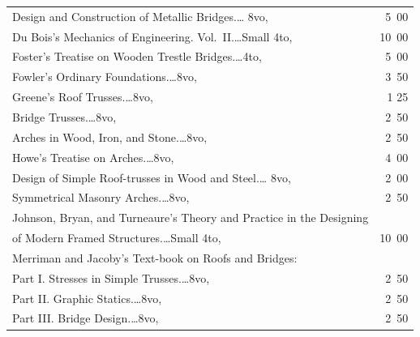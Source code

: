 \documentclass[a4paper,12pt]{book}[2004/02/16]
\theoremstyle{ilemma}
\theoremstyle{itheorem}
\theoremstyle{iother}
\theoremstyle{icorollary}
\theoremstyle{numcorollary}
\theoremstyle{idefinition}
\begin{document}
\begin{longtable}{@{}l@{ }r@{}}
\nopagebreak

\indent Design and Construction of Metallic Bridges.\dotfill\ldots
8vo, &5\ 00\\

Du Bois's Mechanics of Engineering. Vol.~II.\dotfill\ldots Small 4to,
&10\ 00\\

Foster's Treatise on Wooden Trestle Bridges.\dotfill\ldots 4to, &5\ 00\\

Fowler's Ordinary Foundations.\dotfill\ldots 8vo, &3\ 50\\

Greene's Roof Trusses.\dotfill\ldots 8vo, &1 25\\

\nopagebreak

\indent Bridge Trusses.\dotfill\ldots 8vo, &2\ 50\\

\nopagebreak

\indent Arches in Wood, Iron, and Stone.\dotfill\ldots 8vo, &2\ 50\\

Howe's Treatise on Arches.\dotfill\ldots 8vo, &4\ 00\\

\nopagebreak

\indent Design of Simple Roof-trusses in Wood and Steel.\dotfill\ldots
8vo, &2\ 00\\

\nopagebreak

\indent Symmetrical Masonry Arches.\dotfill\ldots 8vo, &2\ 50\\

Johnson, Bryan, and Turneaure's Theory and Practice in the Designing\\

\nopagebreak

\indent\indent of Modern Framed Structures.\dotfill\ldots Small 4to,
&10\ 00\\

Merriman and Jacoby's Text-book on Roofs and Bridges:\\

\indent Part I\@. Stresses in Simple Trusses.\dotfill\ldots 8vo, &2\ 50\\

\indent Part II\@. Graphic Statics.\dotfill\ldots 8vo, &2\ 50\\

\indent Part III\@. Bridge Design.\dotfill\ldots 8vo, &2\ 50\\


\end{longtable}
\end{document}
